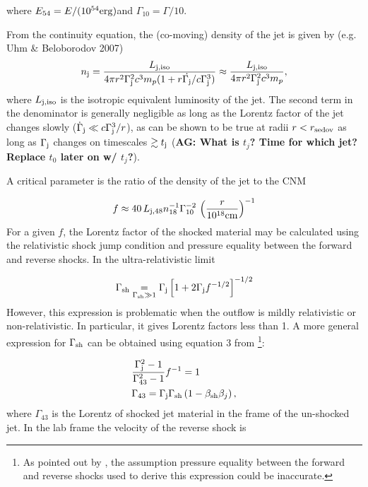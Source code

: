 \documentclass[usenatbib,fleqn]{mnras}
\begin{document}
\noindent where $E_{54}=E/(10^{54} {\rm erg})$and $\Gamma_{10}=\Gamma/10$.

From the continuity equation, the (co-moving) density of the jet is
given by (e.g. Uhm \& Beloborodov 2007)
 \begin{align}
   n_{\rm j} =  \frac{L_{\rm j, iso}}{4 \pi r^{2}\Gamma_{\rm
       j}^{2}c^{3}m_p(1 + r \dot{\Gamma_{\rm j}}/c\Gamma_{\rm j}^{3})}
   \approx  \frac{L_{\rm j, iso}}{4 \pi r^{2}\Gamma_{\rm j}^{2}c^{3}m_p},
\end{align}
%
where $L_{\rm j, iso}$ is the isotropic equivalent luminosity of the
jet. The second term in the denominator is generally negligible as
long as the Lorentz factor of the jet changes slowly
($\dot{\Gamma}_{\rm j} \ll c\Gamma_{\rm j}^{3}/r$), as can be shown to
be true at radii $r < r_{\rm sedov}$ as long as $\Gamma_{\rm j}$
changes on timescales $\gtrsim t_{\rm j}$ ({\bf AG: What is $t_j$?
  Time for which jet? Replace $t_0$ later on w/ $t_j$?}).

A critical parameter is the ratio of the density of the jet to the
CNM

\begin{equation}
  f\approx 40\,  L_{\rm j,48} n_{18}^{-1} \Gamma_{10}^{-2} \, \left(\frac{r}{10^{18} {\rm
        cm}}\right)^{-1} 
\end{equation}
%
For a given $f$, the Lorentz factor of the shocked material may be
calculated using the relativistic shock jump condition and pressure
equality between the forward and reverse shocks. In the
ultra-relativistic limit 

\begin{equation}
\Gamma_{\rm sh} \underset{\Gamma_{\rm sh} \gg 1}= \Gamma_{\rm j}\left[1 + 2\Gamma_{\rm j}f^{-1/2}\right]^{-1/2}
\end{equation}
%
However, this expression is problematic when the outflow is mildly
relativistic or non-relativistic. In particular, it gives Lorentz
factors less than 1. A more general expression for $\Gamma_{\rm sh}$
can be obtained using equation 3 from
\citet{Beloborodov&Uhm2006}\footnote{As pointed out by
  \citet{Beloborodov&Uhm2006}, the assumption pressure equality
  between the forward and reverse shocks used to derive this
  expression could be inaccurate.}:

\begin{align}
&\frac{\Gamma_{\rm j}^2-1}{\Gamma_{43}^2-1} f^{-1}=1\\
&\Gamma_{43}=\Gamma_{\rm j} \Gamma_{\rm sh} \left(1-\beta_{\rm sh} \beta_j\right),
\label{eq:gammaShGen}
\end{align}
%
where $\Gamma_{43}$ is the Lorentz of shocked jet material in the
frame of the un-shocked jet. In the lab frame the velocity of the
reverse shock is
\end{document}
